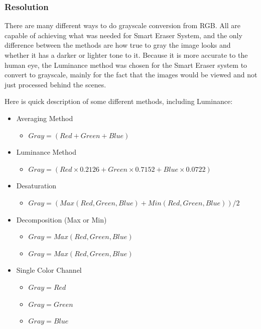 \subsubsection{Resolution}
There are many different ways to do grayscale conversion from RGB. All are capable of achieving what was needed for Smart Eraser System, and the only difference between the methods are how true to gray the image looks and whether it has a darker or lighter tone to it. Because it is more accurate to the human eye, the Luminance method was chosen for the Smart Eraser system to convert to grayscale, mainly for the fact that the images would be viewed and not just processed behind the scenes.\par
Here is quick description of some different methods, including Luminance:\\

\begin{itemize}
\item Averaging Method
	\begin{itemize}
		\item  $ Gray = (Red + Green + Blue) $ 	\cite{Helland}
	\end{itemize}
\item Luminance Method
	\begin{itemize}
		\item $ Gray = (Red \times 0.2126 + Green \times 0.7152 + Blue \times 0.0722) $ \cite{Helland}
	\end{itemize}
\item Desaturation
	\begin{itemize}
		\item $ Gray = (Max(Red, Green, Blue) + Min(Red, Green, Blue)) / 2 $ \cite{Helland}
	\end{itemize}
\item Decomposition (Max or Min)
	\begin{itemize}
		\item $ Gray = Max(Red, Green, Blue) $ \cite{Helland}
		\item $ Gray = Max(Red, Green, Blue) $ \cite{Helland}
	\end{itemize}
\item Single Color Channel
	\begin{itemize}
		\item $ Gray = Red $ \cite{Helland}
		\item $ Gray = Green $ \cite{Helland}
		\item $ Gray = Blue $ \cite{Helland}\\
	\end{itemize}	
\end{itemize}

